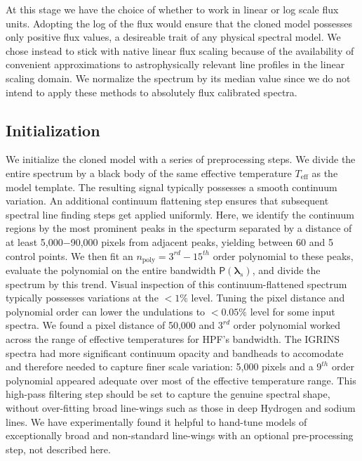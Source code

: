 \documentclass[modern]{aastex631}
\begin{document}
At this stage we have the choice of whether to work in linear or log scale flux units.  Adopting the log of the flux would ensure that the cloned model possesses only positive flux values, a desireable trait of any physical spectral model.  We chose instead to stick with native linear flux scaling because of the availability of convenient approximations to astrophysically relevant line profiles in the linear scaling domain.  We normalize the spectrum by its median value since we do not intend to apply these methods to absolutely flux calibrated spectra.

\subsection{Initialization}

We initialize the cloned model with a series of preprocessing steps.  We divide the entire spectrum by a black body of the same effective temperature $T_{\mathrm{eff}}$ as the model template.  The resulting signal typically possesses a smooth continuum variation.  An additional continuum flattening step ensures that subsequent spectral line finding steps get applied uniformly.  Here, we identify the continuum regions by the most prominent peaks in the specturm separated by a distance of at least 5,000$-$90,000 pixels from adjacent peaks, yielding between 60 and 5 control points.  We then fit an $n_{\mathrm{poly}} = 3^{rd}-15^{th}$ order polynomial to these peaks, evaluate the polynomial on the entire bandwidth $\mathsf{P}(\bm{\lambda}_s)$, and divide the spectrum by this trend.  Visual inspection of this continuum-flattened spectrum typically possesses variations at the $<1\%$ level.  Tuning the pixel distance and polynomial order can lower the undulations to $<0.05\%$ level for some input spectra.  We found a pixel distance of 50,000 and $3^{rd}$ order polynomial worked across the range of effective temperatures for HPF's bandwidth. The IGRINS spectra had more significant continuum opacity and bandheads to accomodate and therefore needed to capture finer scale variation: 5,000 pixels and a $9^{th}$ order polynomial appeared adequate over most of the effective temperature range.  This high-pass filtering step should be set to capture the genuine spectral shape, without over-fitting broad line-wings such as those in deep Hydrogen and sodium lines.  We have experimentally found it helpful to hand-tune models of exceptionally broad and non-standard line-wings with an optional pre-processing step, not described here.
\end{document}
